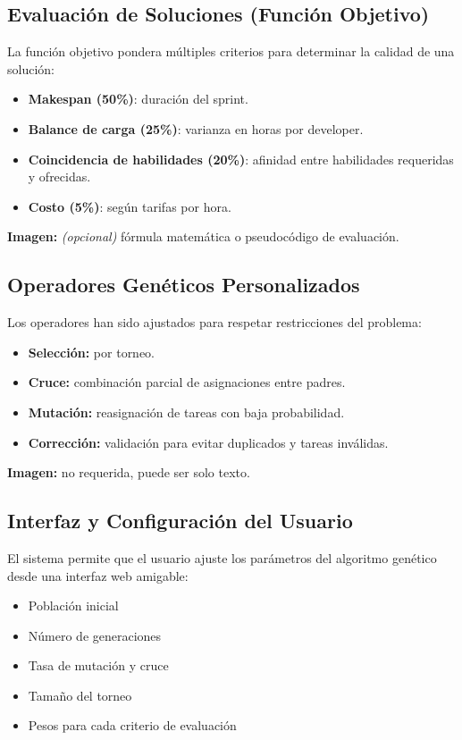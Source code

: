 \subsection{Evaluación de Soluciones (Función Objetivo)}

La función objetivo pondera múltiples criterios para determinar la calidad de una solución:

\begin{itemize}
    \item \textbf{Makespan (50\%)}: duración del sprint.
    \item \textbf{Balance de carga (25\%)}: varianza en horas por developer.
    \item \textbf{Coincidencia de habilidades (20\%)}: afinidad entre habilidades requeridas y ofrecidas.
    \item \textbf{Costo (5\%)}: según tarifas por hora.
\end{itemize}

\noindent\textbf{Imagen:} \textit{(opcional)} fórmula matemática o pseudocódigo de evaluación.

\subsection{Operadores Genéticos Personalizados}

Los operadores han sido ajustados para respetar restricciones del problema:

\begin{itemize}
    \item \textbf{Selección:} por torneo.
    \item \textbf{Cruce:} combinación parcial de asignaciones entre padres.
    \item \textbf{Mutación:} reasignación de tareas con baja probabilidad.
    \item \textbf{Corrección:} validación para evitar duplicados y tareas inválidas.
\end{itemize}

\noindent\textbf{Imagen:} no requerida, puede ser solo texto.

\subsection{Interfaz y Configuración del Usuario}

El sistema permite que el usuario ajuste los parámetros del algoritmo genético desde una interfaz web amigable:

\begin{itemize}
    \item Población inicial
    \item Número de generaciones
    \item Tasa de mutación y cruce
    \item Tamaño del torneo
    \item Pesos para cada criterio de evaluación
\end{itemize}

